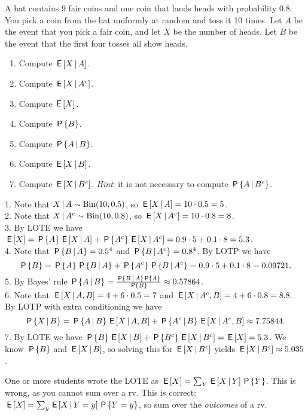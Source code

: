 \begin{exercise}
A hat contains 9 fair coins and one coin that lands heads with probability 0.8. You pick a coin from the hat uniformly at random and toss it 10 times. Let $A$ be the event that you pick a fair coin, and let $X$ be the number of heads. Let $B$ be the event that the first four tosses all show heads.

\begin{enumerate}
\item Compute $\E{X \given A}$.
\item Compute $\E{X \given A^c}$.
\item Compute $\E{X}$.
\item Compute $\P{B}$.
\item Compute $\P{A \given B}$.
\item Compute $\E{X \given B}$.
\item Compute $\E{X \given B^c}$. \textit{Hint}: it is not necessary to compute $\P{A \given B^c}$.
\end{enumerate}

\begin{solution}
1. Note that $X \, |\, A \sim \Bin{10, 0.5}$, so $\E{X \given A} = 10 \cdot 0.5 = 5$. \\
2. Note that $X \, |\,  A^c \sim \Bin{10, 0.8}$, so $\E{X \given A^c} = 10 \cdot 0.8 = 8$. \\
3. By LOTE we have $\E{X} = \P{A}\E{X \given A} +\P{A^c} \E{X \given A^c}  = 0.9 \cdot 5 + 0.1\cdot 8 = 5.3$. \\
4. Note that  $\P{B \given A}  = 0.5^4$ and $\P{B \given A^c}  = 0.8^4$.
By LOTP we have
\begin{equation*}
\P{B} = \P{A}\P{B \given A} +\P{A^c} \P{B \given A^c}  = 0.9 \cdot 5 + 0.1\cdot 8 = 0.09721.
\end{equation*}
5. By Bayes' rule $\P{A \given B} = \frac{\P{B \given A}\P{A}}{\P{B}} \approx 0.57864$. \\
6. Note that $\E{X \given A, B} = 4 + 6 \cdot 0.5 = 7$ and $\E{X \given A^c, B} = 4 + 6 \cdot 0.8 = 8.8$. By LOTP with extra conditioning we have
\begin{equation*}
\P{X \given B} = \P{A \given B}\E{X \given A, B} + \P{A^c \given B}\E{X \given A^c, B} \approx 7.75844.
\end{equation*}
7. By LOTE we have $\P{B}\E{X \given B} +\P{B^c} \E{X \given B^c}  = \E{X} = 5.3$. We know $\P{B}$ and $\E{X \given B}$, so solving this for $\E{X \given B^c}$ yields $\E{X \given B^c} \approx 5.035$.

One or more students wrote the LOTE as $\E X = \sum_{Y} \E{X\given Y} \P{Y}$. This is wrong, as you cannot sum over a rv. This is correct: $\E{X} = \sum_{y} \E{X\given Y=y} \P{Y=y}$, so sum over the \emph{outcomes} of a rv.

\end{solution}
\end{exercise}


